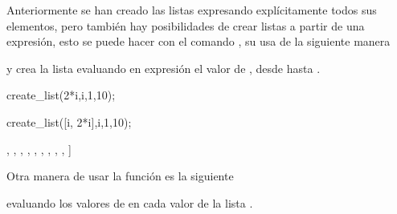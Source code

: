 Anteriormente se han creado las listas expresando explícitamente todos
sus elementos, pero también hay posibilidades de crear listas a partir
de una expresión, esto se puede hacer con el comando
, su usa de la siguiente manera
\begin{center}
\end{center}
y crea la lista evaluando en expresión el valor de ,
desde  hasta .

\begin{maximai}
	create_list(2*i,i,1,10);
\end{maximai}\begin{maximao}
	\left[ 2 , 4 , 6 , 8 , 10 , 12 , 14 , 16 , 18 , 20 \right]
\end{maximao}

\begin{maximai}
	create_list([i, 2*i],i,1,10);
\end{maximai}\begin{maximao}
	\left[ \left[ 1 , 2 \right]  , \left[ 2 , 4 \right]  , \left[ 3 , 6
	\right]  , \left[ 4 , 8 \right]  , \left[ 5 , 10 \right]  , \left[
		6 , 12 \right]  , \left[ 7 , 14 \right]  , \left[ 8 , 16 \right]  ,
	\left[ 9 , 18 \right]  , \left[ 10 , 20 \right]  \right]
\end{maximao}

Otra manera de usar la función
 es la siguiente
\begin{center}
\end{center}
evaluando los valores de  en cada
valor de la lista .

